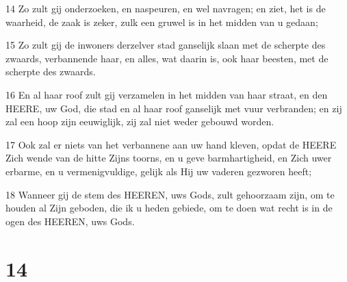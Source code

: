 \par 14 Zo zult gij onderzoeken, en naspeuren, en wel navragen; en ziet, het is de waarheid, de zaak is zeker, zulk een gruwel is in het midden van u gedaan;
\par 15 Zo zult gij de inwoners derzelver stad ganselijk slaan met de scherpte des zwaards, verbannende haar, en alles, wat daarin is, ook haar beesten, met de scherpte des zwaards.
\par 16 En al haar roof zult gij verzamelen in het midden van haar straat, en den HEERE, uw God, die stad en al haar roof ganselijk met vuur verbranden; en zij zal een hoop zijn eeuwiglijk, zij zal niet weder gebouwd worden.
\par 17 Ook zal er niets van het verbannene aan uw hand kleven, opdat de HEERE Zich wende van de hitte Zijns toorns, en u geve barmhartigheid, en Zich uwer erbarme, en u vermenigvuldige, gelijk als Hij uw vaderen gezworen heeft;
\par 18 Wanneer gij de stem des HEEREN, uws Gods, zult gehoorzaam zijn, om te houden al Zijn geboden, die ik u heden gebiede, om te doen wat recht is in de ogen des HEEREN, uws Gods.

\chapter{14}

